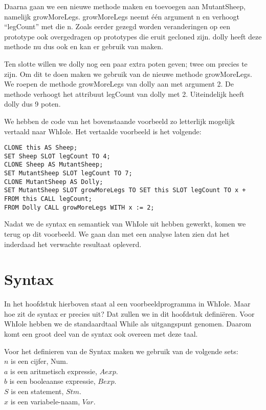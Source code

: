 \documentclass[12pt]{article}
\begin{document}
Daarna gaan we een nieuwe methode maken en toevoegen aan MutantSheep, namelijk growMoreLegs.
growMoreLegs neemt \'e\'en argument n en verhoogt ``legCount'' met die n. 
Zoals eerder gezegd worden veranderingen op een prototype ook overgedragen op prototypes die eruit gecloned zijn. dolly heeft deze methode nu dus ook en kan er gebruik van maken.\newline

Ten slotte willen we dolly nog een paar extra poten geven; twee om precies te zijn.
Om dit te doen maken we gebruik van de nieuwe methode growMoreLegs.
We roepen de methode growMoreLegs van dolly aan met argument 2.
De methode verhoogt het attribuut legCount van dolly met 2.
Uiteindelijk heeft dolly dus 9 poten.

We hebben de code van het bovenstaande voorbeeld zo letterlijk mogelijk vertaald naar WhIole.
Het vertaalde voorbeeld is het volgende:
\begin{lstlisting}[frame=single]
CLONE this AS Sheep;
SET Sheep SLOT legCount TO 4;
CLONE Sheep AS MutantSheep;
SET MutantSheep SLOT legCount TO 7;
CLONE MutantSheep AS Dolly;
SET MutantSheep SLOT growMoreLegs TO SET this SLOT legCount TO x + FROM this CALL legCount;
FROM Dolly CALL growMoreLegs WITH x := 2;
\end{lstlisting}
Nadat we de syntax en semantiek van WhIole uit hebben gewerkt, komen we terug op dit voorbeeld.
We gaan dan met een analyse laten zien dat het inderdaad het verwachte resultaat opleverd.

\pagebreak
\section{Syntax}
In het hoofdstuk hierboven staat al een voorbeeldprogramma in WhIole. Maar hoe zit de syntax er precies uit? Dat zullen we in dit hoofdstuk definiëren. Voor WhIole hebben we de standaardtaal While als uitgangspunt genomen. Daarom komt een groot deel van de syntax ook overeen met deze taal.

Voor het definieren van de Syntax maken we gebruik van de volgende sets:\\
$n$ is een cijfer, Num. \\
$a$ is een aritmetisch expressie, $Aexp$. \\
$b$ is een booleaanse expressie, $Bexp$. \\
$S$ is een statement, $Stm$. \\
$x$ is een variabele-naam, $Var$. \\
\end{document}
